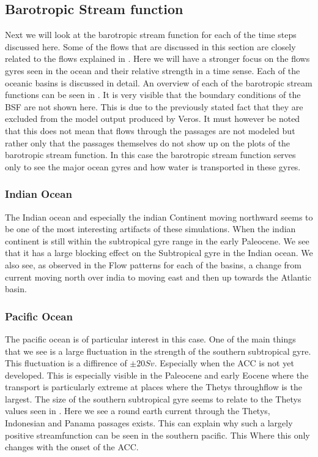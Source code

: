 \subsection{Barotropic Stream function}
\label{sec:BSF}

Next we will look at the barotropic stream function for each of the time steps discussed here. Some of the flows that are discussed in this section are closely related to the flows explained in . Here we will have a stronger focus on the flows gyres seen in the ocean and their relative strength in a time sense. Each of the oceanic basins is discussed in detail. An overview of each of the barotropic stream functions can be seen in . It is very visible that the boundary conditions of the BSF are not shown here. This is due to the previously stated fact that they are excluded from the model output produced by Veros. It must however be noted that this does not mean that flows through the passages are not modeled but rather only that the passages themselves do not show up on the plots of the barotropic stream function. In this case the barotropic stream function serves only to see the major ocean gyres and how water is transported in these gyres.

\subsubsection{Indian Ocean}
The Indian ocean and especially the indian Continent moving northward seems to be one of the most interesting artifacts of these simulations. When the indian continent is still within the subtropical gyre range in the early Paleocene. We see that it has a large blocking effect on the Subtropical gyre in the Indian ocean. We also see, as observed in the Flow patterns for each of the basins, a change from current moving north over india to moving east and then up towards the Atlantic basin.
\subsubsection{Pacific Ocean}
The pacific ocean is of particular interest in this case. One of the main things that we see is a large fluctuation in the strength of the southern subtropical gyre. This fluctuation is a diffirence of $\pm 20 Sv$.  Especially when the ACC is not yet developed. This is especially visible in the Paleocene and early Eocene where the transport is particularly extreme at places where the Thetys throughflow is the largest. The size of the southern subtropical gyre seems to relate to the Thetys values seen in . Here we see a round earth current through the Thetys, Indonesian and Panama passages exists. This can explain why such a largely positive streamfunction can be seen in the southern pacific. This  Where this only changes with the onset of the ACC.
